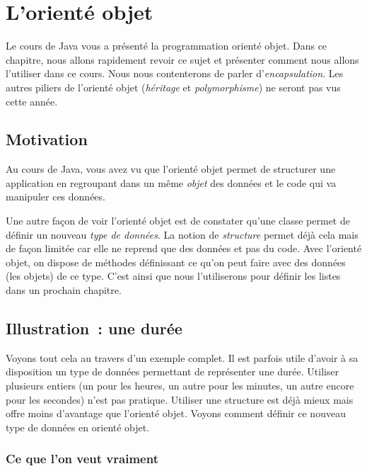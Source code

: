 \chapter{L'orienté objet}

	Le cours de Java vous a présenté la programmation orienté objet.
	Dans ce chapitre, nous allons rapidement revoir ce sujet
	et présenter comment nous allons l'utiliser dans ce cours.
	Nous nous contenterons de parler d'\textit{encapsulation}. 
	Les autres piliers de l'orienté objet 
	(\textit{héritage} et \textit{polymorphisme}) 
	ne seront pas vus cette année.

\section{Motivation}

	Au cours de Java,
	vous avez vu que l'orienté objet permet de structurer une
	application en regroupant dans un même \emph{objet}
	des données et le code qui va manipuler ces données.
	
	Une autre façon de voir l'orienté objet
	est de constater qu'une classe permet de définir 
	un nouveau \emph{type de données}.
	La notion de \emph{structure} permet déjà cela mais de façon limitée
	car elle ne reprend que des données et pas du code.
	Avec l'orienté objet, 
	on dispose de méthodes définissant ce qu'on peut faire avec des données
	(les objets) de ce type.
	C'est ainsi que nous l'utiliserons pour définir les listes 
	dans un prochain chapitre.

	
\section{Illustration~: une durée}

	Voyons tout cela au travers d'un exemple complet.
	Il est parfois utile d'avoir à sa disposition un type
	de données permettant de représenter une durée.	
	Utiliser plusieurs entiers (un pour les heures, un autre pour les minutes,
	un autre encore pour les secondes) n'est pas pratique.
	Utiliser une structure est déjà mieux mais offre moins d'avantage
	que l'orienté objet.	
	Voyons comment définir ce nouveau type de données en orienté objet.
	
	\subsection{Ce que l’on veut vraiment}
	

